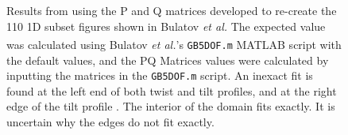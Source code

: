 \documentclass[12pt]{report}
\begin{document}
\begin{figure}[ht!]
 \centering
 \quad
 \quad
 \caption{\label{fig:reproduceBulatov110} Results from using the P and Q matrices developed to re-create the \textlangle{}110\textrangle{} 1D subset figures shown in Bulatov \emph{et al.}  The expected value was calculated using Bulatov \emph{et al.}'s \lstinline!GB5DOF.m! MATLAB\textsuperscript{\textregistered} script with the default values, and the PQ Matrices values were calculated by inputting the matrices in the \lstinline!GB5DOF.m! script.  An inexact fit is found at the left end of both twist \protect{} and tilt \protect{} profiles, and at the right edge of the tilt profile \protect{}.  The interior of the domain fits exactly.  It is uncertain why the edges do not fit exactly.}
\end{figure}
\end{document}

